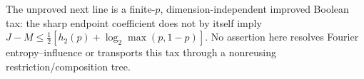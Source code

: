 \documentclass{article}
\begin{document}
The unproved next line is a finite-$p$, dimension-independent improved
Boolean tax: the sharp endpoint coefficient does not by itself imply
$J-M\le\tfrac12[h_2(p)+\log_2\max(p,1-p)]$.
No assertion here resolves Fourier entropy--influence or transports this tax
through a nonreusing restriction/composition tree.
\end{document}
